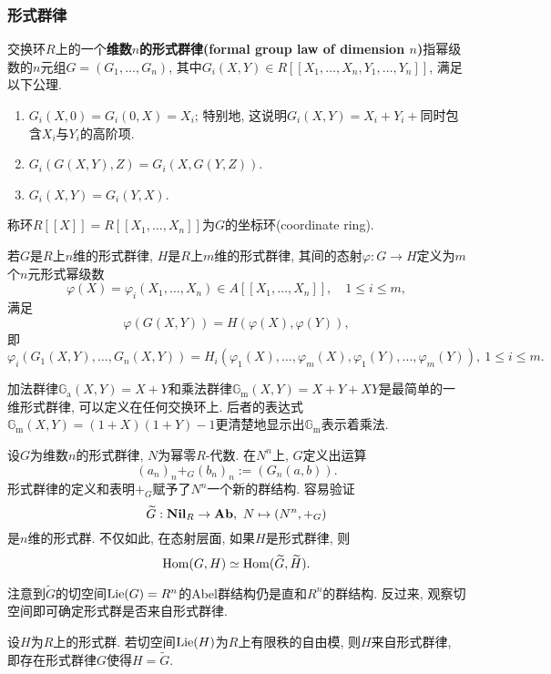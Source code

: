 \subsubsection{形式群律}
\begin{definition}\label{def: formal group law}
    交换环$R$上的一个\textbf{维数$n$的形式群律(formal group law of dimension $n$)}指幂级数的$n$元组$G = (G_1, \dots, G_n)$,
    其中$G_i(X, Y)\in R[[X_1, \dots, X_n, Y_1, \dots, Y_n]]$, 满足以下公理.\begin{enumerate}
        \item [\myit] $G_i(X, 0) = G_i(0, X) = X_i$; 特别地, 这说明$G_i(X, Y) = X_i + Y_i + {}$\!同时包含$X_i$与$Y_i$的高阶项.
        \item [\myit] $G_i(G(X, Y), Z) = G_i(X, G(Y, Z))$.
        \item [\myit] $G_i(X, Y) = G_i(Y, X)$.
    \end{enumerate}
    称环$R[[X]] = R[[X_1, \dots, X_n]]$为$G$的坐标环(coordinate ring).
    
    若$G$是$R$上$n$维的形式群律, $H$是$R$上$m$维的形式群律, 其间的态射$\varphi : G \to H$定义为$m$个$n$元形式幂级数\[\varphi(X) = \varphi_i(X_1, \dots, X_n)\in A[[X_1, \dots, X_n]],\quad 1\le i\le m,\]
    满足\[\varphi(G(X, Y)) = H(\varphi(X), \varphi(Y)),\]
    即\[\varphi_i(G_1(X, Y),\dots, G_n(X, Y)) = H_i(\varphi_1(X), \dots, \varphi_m(X), \varphi_1(Y), \dots, \varphi_m(Y)),\ 1\le i\le m.\]
\end{definition}
加法群律$\mathbb{G}_{\mathrm{a}}(X, Y) = X + Y$和乘法群律$\mathbb{G}_{\mathrm{m}}(X, Y) = X + Y + XY$是最简单的一维形式群律, 可以定义在任何交换环上.
后者的表达式$\mathbb{G}_{\mathrm{m}}(X, Y) = (1 + X)(1+Y)-1$更清楚地显示出$\mathbb{G}_{\mathrm{m}}$表示着乘法.

设$G$为维数$n$的形式群律, $N$为幂零$R$-代数. 在$N^n$上, $G$定义出运算\[(a_n)_n +_G (b_n)_n := (G_n(a, b)).\]
形式群律的定义和\cite[Corollary 1.5]{Zi84}表明$+_G$赋予了$N^n$一个新的群结构.
容易验证\[\tilde{G} : \nil_R\to\abel,\ N\mapsto (N^n, +_G)\]是$n$维的形式群.
不仅如此, 在态射层面, 如果$H$是形式群律, 则\[\operatorname{Hom}(G, H)\simeq\operatorname{Hom}(\widetilde{G}, \widetilde{H}).\]

注意到$\tilde{G}$的切空间$\operatorname{Lie}(G) = R^n$的Abel群结构仍是直和$R^n$的群结构.
反过来, 观察切空间即可确定形式群是否来自形式群律.

\begin{theorem}\label{from formal group law if free of finite rank}
    \cite[Corollary 2.32]{Zi84}
    设$H$为$R$上的形式群. 若切空间$\operatorname{Lie}(H)$为$R$上有限秩的自由模, 则$H$来自形式群律, 即存在形式群律$G$使得$H = \tilde{G}$.
\end{theorem}

